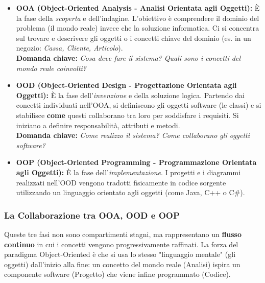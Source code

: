 \documentclass[10pt, a4paper]{article}
\begin{document}
\begin{itemize}
    \item \textbf{OOA (Object-Oriented Analysis - Analisi Orientata agli Oggetti):} È la fase della \textit{scoperta} e dell'indagine. L'obiettivo è comprendere il dominio del problema (il mondo reale) invece che la soluzione informatica. Ci si concentra sul trovare e descrivere gli oggetti o i concetti chiave del dominio (es. in un negozio: \textit{Cassa, Cliente, Articolo}). \\
    \textbf{Domanda chiave:} \textit{Cosa deve fare il sistema? Quali sono i concetti del mondo reale coinvolti?}
    
    \item \textbf{OOD (Object-Oriented Design - Progettazione Orientata agli Oggetti):} È la fase dell'\textit{invenzione} e della soluzione logica. Partendo dai concetti individuati nell'OOA, si definiscono gli oggetti software (le classi) e si stabilisce \textbf{come} questi collaborano tra loro per soddisfare i requisiti. Si iniziano a definire responsabilità, attributi e metodi. \\
    \textbf{Domanda chiave:} \textit{Come realizzo il sistema? Come collaborano gli oggetti software?}
    
    \item \textbf{OOP (Object-Oriented Programming - Programmazione Orientata agli Oggetti):} È la fase dell'\textit{implementazione}. I progetti e i diagrammi realizzati nell'OOD vengono tradotti fisicamente in codice sorgente utilizzando un linguaggio orientato agli oggetti (come Java, C++ o C\#).
\end{itemize}

\subsubsection*{La Collaborazione tra OOA, OOD e OOP}
Queste tre fasi non sono compartimenti stagni, ma rappresentano un \textbf{flusso continuo} in cui i concetti vengono progressivamente raffinati. La forza del paradigma Object-Oriented è che si usa lo stesso "linguaggio mentale" (gli oggetti) dall'inizio alla fine: un concetto del mondo reale (Analisi) ispira un componente software (Progetto) che viene infine programmato (Codice).

\vspace{0.5cm} %
\end{document}
